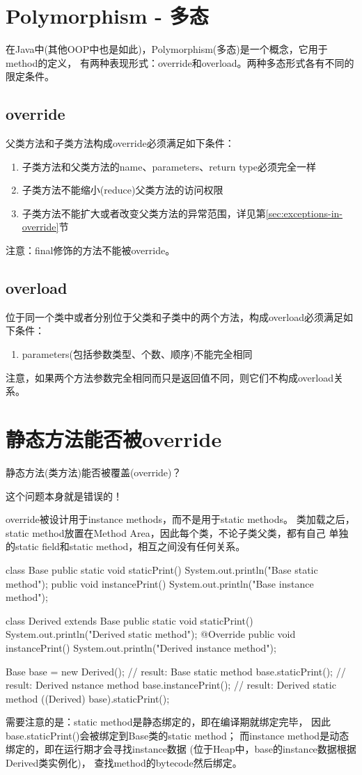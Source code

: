 ﻿\section[Polymorphism - 多态]{Polymorphism - 多态}
在Java中(其他OOP中也是如此)，Polymorphism(多态)是一个概念，它用于method的定义，
有两种表现形式：override和overload。两种多态形式各有不同的限定条件。

\subsection[override]{override}
父类方法和子类方法构成override必须满足如下条件：

\begin{enumerate}
  \item 子类方法和父类方法的name、parameters、return type必须完全一样
  \item 子类方法不能缩小(reduce)父类方法的访问权限
  \item 子类方法不能扩大或者改变父类方法的异常范围，详见第\ref{sec:exceptions-in-override}节
\end{enumerate}

注意：final修饰的方法不能被override。

\subsection[overload]{overload}
位于同一个类中或者分别位于父类和子类中的两个方法，构成overload必须满足如下条件：

\begin{enumerate}
  \item parameters(包括参数类型、个数、顺序)不能完全相同
\end{enumerate}

注意，如果两个方法参数完全相同而只是返回值不同，则它们不构成overload关系。

\section[静态方法能否被override]{静态方法能否被override}
静态方法(类方法)能否被覆盖(override)？

这个问题本身就是错误的！

override被设计用于instance methods，而不是用于static methods。
类加载之后，static method放置在Method Area，因此每个类，不论子类父类，都有自己
单独的static field和static method，相互之间没有任何关系。

\begin{javacode}
class Base {
  public static void staticPrint() {
    System.out.println("Base static method");
  }
  public void instancePrint() {
    System.out.println("Base instance method");
  }
}

class Derived extends Base {
  public static void staticPrint() {
    System.out.println("Derived static method");
  }
  @Override
  public void instancePrint() {
    System.out.println("Derived instance method");
  }
}

Base base = new Derived();
// result: Base static method
base.staticPrint();
// result: Derived nstance method
base.instancePrint();
// result: Derived static method
((Derived) base).staticPrint();
\end{javacode}

需要注意的是：static method是静态绑定的，即在编译期就绑定完毕，
因此base.staticPrint()会被绑定到Base类的static method；
而instance method是动态绑定的，即在运行期才会寻找instance数据
(位于Heap中，base的instance数据根据Derived类实例化)，
查找method的bytecode然后绑定。